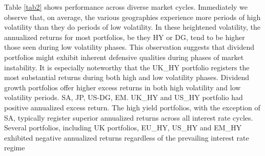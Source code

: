 \documentclass[12pt,preprint, authoryear]{elsarticle}
\numberwithin{equation}{section}
\numberwithin{figure}{section}
\numberwithin{table}{section}
\begin{document}
Table \ref{tab2} shows performance across diverse market cycles.
Immediately we observe that, on average, the various geographies
experience more periods of high volatility than they do periods of low
volatility. In these heightened volatility, the annualized returns for
most portfolios, be they HY or DG, tend to be higher those seen during
low volatility phases. This observation suggests that dividend
portfolios might exhibit inherent defensive qualities during phases of
market instability. It is especially noteworthy that the UK\_HY
portfolio registers the most substantial returns during both high and
low volatility phases. Dividend growth portfolios offer higher excess
returns in both high volatility and low volatility periods. SA, JP,
US-DG, EM. UK\_HY and US\_HY portfolio had positive annualized excess
return. The high yield portfolios, with the exception of SA, typically
register superior annualized returns across all interest rate cycles.
Several portfolios, including UK portfolios, EU\_HY, US\_HY and EM\_HY
exhibited negative annualized returns regardless of the prevailing
interest rate regime
\end{document}
